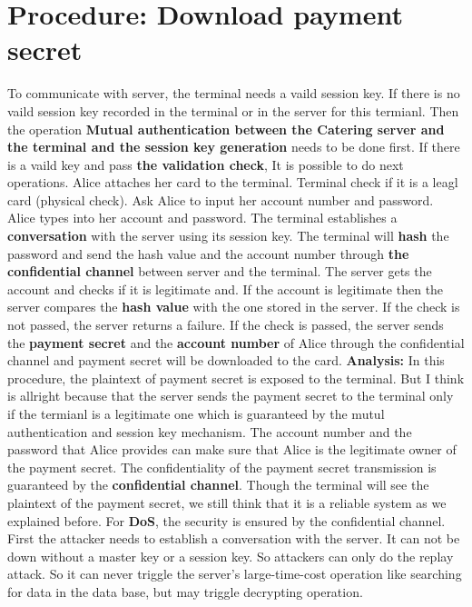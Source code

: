 \documentclass{article}
\begin{document}
    \section{Procedure: Download payment secret}
To communicate with server, the terminal needs a vaild session key. 
If there is no vaild session key recorded in the terminal or in the server for this termianl. 
Then the operation \textbf{Mutual authentication between the Catering server and the terminal and the session key generation} needs to be done first. 
If there is a vaild key and pass \textbf{the validation check},
It is possible to do next operations.
        \newline 
Alice attaches her card to the terminal. 
Terminal check if it is a leagl card (physical check). 
Ask Alice to input her account number and password. 
Alice types into her account and password. 
The terminal establishes a \textbf{conversation} with the server using its session key.
The terminal will \textbf{hash} the password and send the hash value and the account number through \textbf{the confidential channel} between server and the terminal. 
The server gets the account and checks if it is legitimate and. 
If the account is legitimate then the server compares the \textbf{hash value} with the one stored in the server. 
If the check is not passed, the server returns a failure.
If the check is passed, the server sends the \textbf{payment secret} and the \textbf{account number} of Alice through the confidential channel and payment secret will be downloaded to the card.
        \newline 
\textbf{Analysis:}
        \newline
In this procedure, the plaintext of payment secret is exposed to the terminal. 
But I think is allright because that the server sends the payment secret to the terminal only if the termianl is a legitimate one which is guaranteed by the mutul authentication and session key mechanism.
The account number and the password that Alice provides can make sure that Alice is the legitimate owner of the payment secret.
        \newline
The confidentiality of the payment secret transmission is guaranteed by the \textbf{confidential channel}. 
Though the terminal will see the plaintext of the payment secret,
we still think that it is a reliable system as we explained before.
        \newline
For \textbf{DoS}, the security is ensured by the confidential channel. 
First the attacker needs to establish a conversation with the server. 
It can not be down without a master key or a session key. 
So attackers can only do the replay attack. 
So it can never triggle the server's large-time-cost operation like searching for data in the data base,
but may triggle decrypting operation.
        \newline
\end{document}
